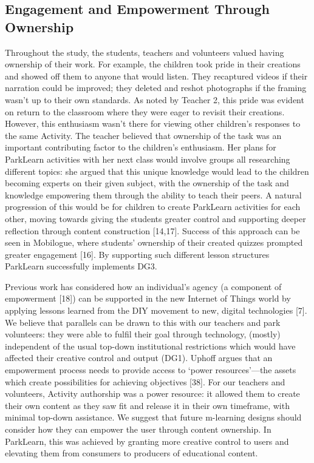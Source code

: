 \subsection{Engagement and Empowerment Through Ownership}

Throughout the study, the students, teachers and volunteers valued having
ownership of their work. For example, the children took pride in their creations
and showed off them to anyone that would listen. They recaptured videos if their
narration could be improved; they deleted and reshot photographs if the framing
wasn’t up to their own standards. As noted by Teacher 2, this pride was evident
on return to the classroom where they were eager to revisit their creations.
However, this enthusiasm wasn’t there for viewing other children’s responses to
the same Activity. The teacher believed that ownership of the task was an
important contributing factor to the children’s enthusiasm. Her plans for
ParkLearn activities with her next class would involve groups all researching
different topics: she argued that this unique knowledge would lead to the
children becoming experts on their given subject, with the ownership of the task
and knowledge empowering them through the ability to teach their peers. A
natural progression of this would be for children to create ParkLearn activities
for each other, moving towards giving the students greater control and
supporting deeper reflection through content construction [14,17]. Success of
this approach can be seen in Mobilogue, where students’ ownership of their
created quizzes prompted greater engagement [16]. By supporting such different
lesson structures ParkLearn successfully implements DG3.

Previous work has considered how an individual’s agency (a component of
empowerment [18]) can be supported in the new Internet of Things world by
applying lessons learned from the DIY movement to new, digital technologies [7].
We believe that parallels can be drawn to this with our teachers and park
volunteers: they were able to fulfil their goal through technology, (mostly)
independent of the usual top-down institutional restrictions which would have
affected their creative control and output (DG1). Uphoff argues that an
empowerment process needs to provide access to ‘power resources’—the assets
which create possibilities for achieving objectives [38]. For our teachers and
volunteers, Activity authorship was a power resource: it allowed them to create
their own content as they saw fit and release it in their own timeframe, with
minimal top-down assistance. We suggest that future m-learning designs should
consider how they can empower the user through content ownership. In ParkLearn,
this was achieved by granting more creative control to users and elevating them
from consumers to producers of educational content.

